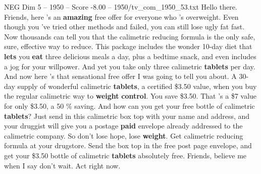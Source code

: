 \begin{textsample}{NEG Dim 5 – 1950 – Score -8.00 – 1950/tv\_com\_1950\_53.txt}  \label{ex:f5_neg_041}
Hello there.
Friends, here 's an \textbf{amazing} free offer for everyone who 's overweight.
Even though you 've tried other methods and failed, you can still lose ugly fat fast.
Now thousands can tell you that the calimetric reducing formula is the only safe, sure, effective way to reduce.
This package includes the wonder 10-day diet that \textbf{lets} you \textbf{eat} three delicious meals a day, plus a bedtime snack, and even includes a jog for your willpower.
And yet you take only three calimetric \textbf{tablets} per day.
And now here 's that sensational free offer I was going to tell you about.
A 30-day supply of wonderful calimetric \textbf{tablets}, a certified \$3.50 value, when you buy the regular calimetric way to \textbf{weight} \textbf{control}.
You save \$3.50.
That 's a \$7 value for only \$3.50, a 50 \% saving.
And how can you get your free bottle of calimetric \textbf{tablets}?
Just send in this calimetric box top with your name and address, and your druggist will give you a postage \textbf{paid} envelope already addressed to the calimetric company.
So don't lose hope, lose \textbf{weight}.
Get calimetric reducing formula at your drugstore.
Send the box top in the free post page envelope, and get your \$3.50 bottle of calimetric \textbf{tablets} absolutely free.
Friends, believe me when I say don't wait.
Act right now.

\end{textsample}
